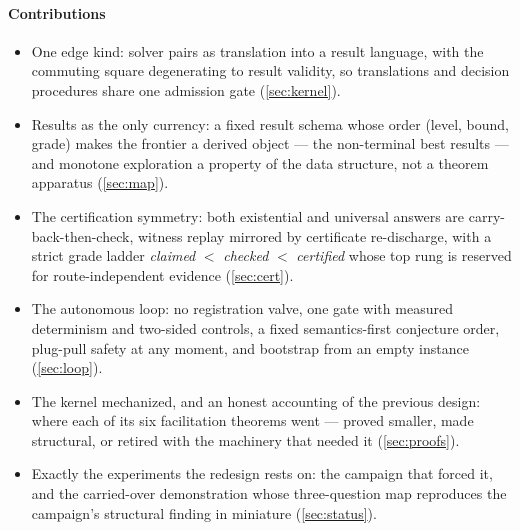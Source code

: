 \paragraph{Contributions}
\begin{itemize}
\item One edge kind: solver pairs as translation into a result
  language, with the commuting square degenerating to result
  validity, so translations and decision procedures share one
  admission gate (\cref{sec:kernel}).
\item Results as the only currency: a fixed result schema whose
  order (level, bound, grade) makes the frontier a derived object ---
  the non-terminal best results --- and monotone exploration a
  property of the data structure, not a theorem apparatus
  (\cref{sec:map}).
\item The certification symmetry: both existential and universal
  answers are carry-back-then-check, witness replay mirrored by
  certificate re-discharge, with a strict grade ladder
  \emph{claimed} $<$ \emph{checked} $<$ \emph{certified} whose top
  rung is reserved for route-independent evidence
  (\cref{sec:cert}).
\item The autonomous loop: no registration valve, one gate with
  measured determinism and two-sided controls, a fixed
  semantics-first conjecture order, plug-pull safety at any moment,
  and bootstrap from an empty instance (\cref{sec:loop}).
\item The kernel mechanized, and an honest accounting of the
  previous design: where each of its six facilitation theorems went
  --- proved smaller, made structural, or retired with the machinery
  that needed it (\cref{sec:proofs}).
\item Exactly the experiments the redesign rests on: the campaign
  that forced it, and the carried-over demonstration whose
  three-question map reproduces the campaign's structural finding in
  miniature (\cref{sec:status}).
\end{itemize}

